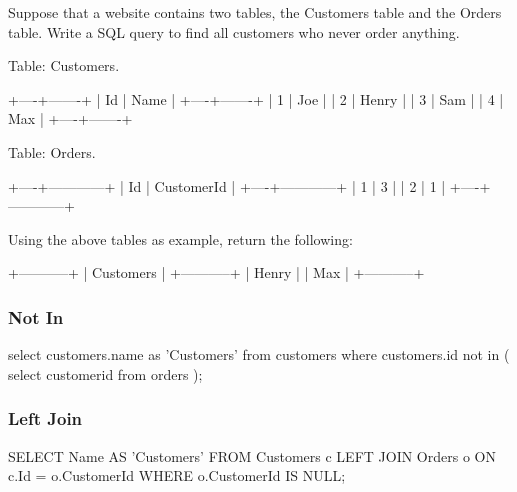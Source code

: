 Suppose that a website contains two tables, the Customers table and the Orders table. Write a SQL query to find all customers who never order anything.

Table: Customers.
\begin{Code}
+----+-------+
| Id | Name  |
+----+-------+
| 1  | Joe   |
| 2  | Henry |
| 3  | Sam   |
| 4  | Max   |
+----+-------+
\end{Code}

Table: Orders.

\begin{Code}
+----+------------+
| Id | CustomerId |
+----+------------+
| 1  | 3          |
| 2  | 1          |
+----+------------+
\end{Code}

Using the above tables as example, return the following:

\begin{Code}
+-----------+
| Customers |
+-----------+
| Henry     |
| Max       |
+-----------+
\end{Code}

\subsubsection{Not In}
\begin{Code}
select customers.name as 'Customers'
from customers
where customers.id not in
(
    select customerid from orders
);
\end{Code}

\subsubsection{Left Join}
\begin{Code}
SELECT Name AS 'Customers'
FROM Customers c
LEFT JOIN Orders o
ON c.Id = o.CustomerId
WHERE o.CustomerId IS NULL;
\end{Code}